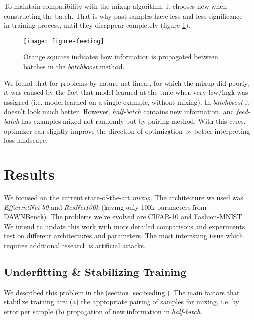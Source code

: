 \documentclass{article}
\begin{document}
To maintain compatibility with the mixup
algorithm, it chooses new  when constructing the batch.
That is why past samples have less and less significance in training process,
until they disappear completely (figure \ref{fig:feeding}).

\begin{figure}[H]
  \hspace{0.5cm}
  \texttt{[image: figure-feeding]}
  \caption{Orange squares indicates how information is propagated between
	  batches in the \emph{batchboost} method.}
  \label{fig:feeding}
\end{figure}

We found that for problems by nature not linear, for which the mixup did poorly,
it was caused by the fact that model learned at the time when very low/high
 was assigned (i.e. model learned on a single example, without mixing).
In \emph{batchboost} it doesn't look much better. However, \emph{half-batch}
contains new information, and \emph{feed-batch} has examples mixed not randomly but
by pairing method. With this clues, optimizer can slightly improve the direction of
optimization by better interpreting loss landscape.

\section{Results}
\label{sec:results}

We focused on the current state-of-the-art \emph{mixup}. The architecture we
used was \emph{EfficientNet-b0}\cite{tan2019efficientnet} and
\emph{ResNet100k}\cite{DBLP:journals/corr/HeZRS15} (having only 100k
parameters from DAWNBench\cite{coleman2017dawnbench}). The problems we've evolved are CIFAR-10 and
Fashion-MNIST.
We intend to update this work with more detailed comparisons and experiments,
test on different architectures and parameters. The most interesting
issue which requires additional research is artificial attacks.

\subsection{Underfitting \& Stabilizing Training}
\label{sec:under}

We described this problem in the (section \ref{sec:feeding}). The main factors
that stabilize training are: (a) the appropriate pairing of samples for mixing,
i.e. by error per sample (b) propagation of new information in \emph{half-batch}.
\end{document}
